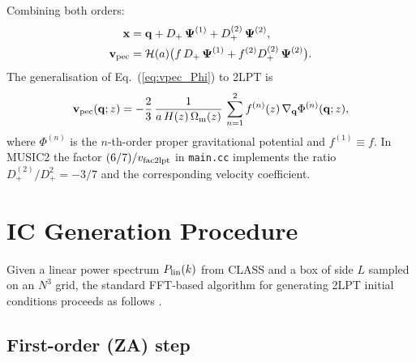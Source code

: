 \documentclass[12pt]{article}
\newcommand{\bq}{\mathbf{q}}
\newcommand{\bx}{\mathbf{x}}
\newcommand{\bPsi}{\boldsymbol{\Psi}}
\newcommand{\bv}{\mathbf{v}}
\newcommand{\Dp}{D_+}
\newcommand{\Dpp}{D_+^{(2)}}
\newcommand{\Omm}{\Omega_{\rm m}}
\newcommand{\calH}{\mathcal{H}}
\begin{document}
Combining both orders:
%
\begin{align}
  \bx &= \bq + \Dp\,\bPsi^{(1)} + \Dpp\,\bPsi^{(2)},
  \label{eq:x_total}\\
  \bv_{\rm pec} &= \calH(a)\bigl(f\,\Dp\,\bPsi^{(1)}
                   + f^{(2)}\Dpp\,\bPsi^{(2)}\bigr).
  \label{eq:v_total}
\end{align}
%
The generalisation of Eq.~(\ref{eq:vpec_Phi}) to 2LPT is
%
\begin{equation}
  \bv_{\rm pec}(\bq; z)
    = -\frac{2}{3}\,\frac{1}{a\,H(z)\,\Omm(z)}\,
      \sum_{n=1}^{2} f^{(n)}(z)\,\nabla_\bq\Phi^{(n)}(\bq; z),
  \label{eq:vpec_2lpt}
\end{equation}
%
where $\Phi^{(n)}$ is the $n$-th-order proper gravitational potential
and $f^{(1)} \equiv f$.  In MUSIC2 the factor
$(6/7)/v_{\rm fac2lpt}$ in \texttt{main.cc} implements the ratio
$\Dpp/\Dp^2 = -3/7$ and the corresponding velocity coefficient.

\section{IC Generation Procedure}
\label{sec:icgen}

Given a linear power spectrum $P_{\rm lin}(k)$ from CLASS and a box
of side $L$ sampled on an $N^3$ grid, the standard FFT-based algorithm
for generating 2LPT initial conditions proceeds as follows
\citep{Jeong2010}.

\subsection{First-order (ZA) step}
\end{document}
